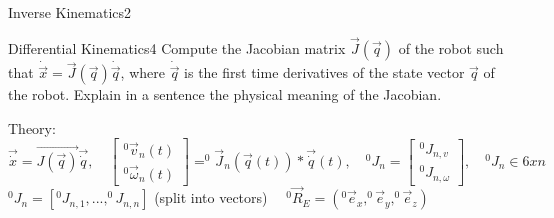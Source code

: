 \begin{questions}
\begin{question}{Inverse Kinematics}{2}
\begin{answer}
	

	\end{answer}

\end{question}


\begin{question}{Differential Kinematics}{4}
Compute the Jacobian matrix $\vec{J}(\vec{q})$ of the robot such that $\dot{\vec{x}}=\vec{J}(\vec{q})\dot{\vec{q}}$, where $\dot{\vec{q}}$ is the first time derivatives of the state vector $\vec{q}$ of the robot. Explain in a sentence the physical meaning of the Jacobian.

\begin{answer}
	Theory:\\
	$\vec{\dot{x}} = \vec{J(\vec{q})} \vec{\dot{q}}, \quad \begin{bmatrix}
	^0\vec{v}_n(t) \\ ^0\vec{\omega}_n(t)
	\end{bmatrix}= ^0\vec{J}_n(\vec{q}(t)) * \vec{\dot{q}}(t), \quad ^0J_n = \begin{bmatrix}
	^0J_{n,v}\\^0J_{n,\omega}
	\end{bmatrix}, \quad ^0J_n \in 6 x n \quad$$^0J_n = [^0J_{n,1}, ..., ^0J_{n,n}]$ (split into vectors)
	$\quad ^0\vec{R}_E=(^0\vec{e}_x,^0\vec{e}_y,^0\vec{e}_z)$
	\\
	

\end{answer}
\end{question}
\end{questions}
